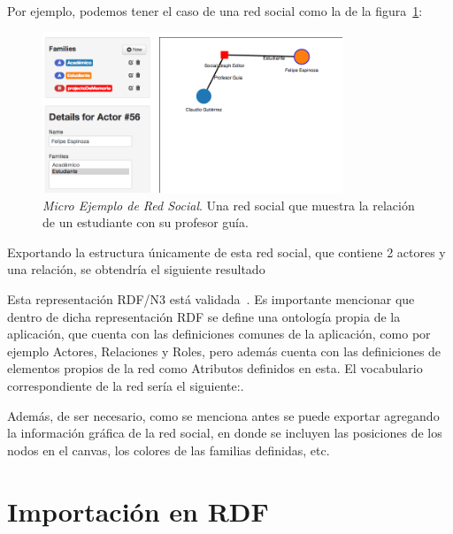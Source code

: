 Por ejemplo, podemos tener el caso de una red social como la de la figura~\ref{mini_red_ejemplo}:

\begin{figure}[H]
  \centering
  \includegraphics[width=0.8\textwidth]{images/mini_red_ejemplo.png}
  \caption[Micro Ejemplo de Red Social]{\emph{Micro Ejemplo de Red Social}. Una red social que muestra la relación de un estudiante con su profesor guía.}
  \label{mini_red_ejemplo}
\end{figure}


Exportando la estructura únicamente de esta red social, que contiene 2 actores y una relación, se obtendría el siguiente resultado\\


\label{lst:red_n3}

Esta representación RDF/N3 está validada~\cite{validador_rdf}. Es importante mencionar que dentro de dicha representación RDF se define una ontología propia de la aplicación, que cuenta con las definiciones comunes de la aplicación, como por ejemplo Actores, Relaciones y Roles, pero además cuenta con las definiciones de elementos propios de la red como Atributos definidos en esta. El vocabulario correspondiente de la red sería el siguiente:.


\label{lst:vocabulario_n3}

Además, de ser necesario, como se menciona antes se puede exportar agregando la información gráfica de la red social, en donde se incluyen las posiciones de los nodos en el canvas, los colores de las familias definidas, etc.


\section{Importación en RDF} %
\label{sec:importacion_en_rdf}

